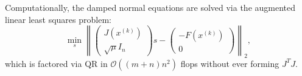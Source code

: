 Computationally, the damped normal equations are solved via the augmented linear least squares problem:
\begin{equation}
    \min_{s} \left\| \begin{pmatrix} J(x^{(k)}) \\ \sqrt{\mu} I_n \end{pmatrix} s - \begin{pmatrix} -F(x^{(k)}) \\ 0 \end{pmatrix} \right\|_2,
\end{equation}
which is factored via QR in $\mathcal{O}((m+n)n^2)$ flops without ever forming $J^T J$.
